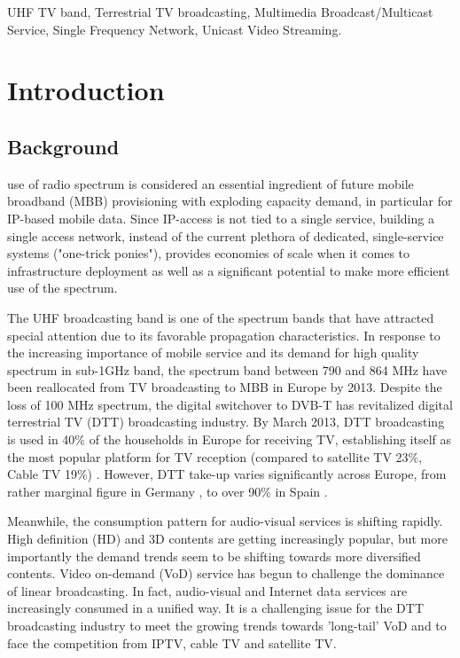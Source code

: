 \documentclass[journal]{IEEEtran}
\begin{document}
\begin{IEEEkeywords}
UHF TV band, Terrestrial TV broadcasting,  Multimedia Broadcast/Multicast Service, Single Frequency Network, Unicast Video Streaming.
\end{IEEEkeywords}
\IEEEpeerreviewmaketitle

\section{Introduction}
\label{sec:intro}
\subsection{Background}
 use of radio spectrum is considered an essential ingredient of future mobile broadband (MBB) provisioning with exploding capacity demand, in particular for IP-based mobile data. Since IP-access is not tied to a single service, building a single access network, instead of the current plethora of dedicated, single-service systems ("one-trick ponies"), provides economies of scale when it comes to infrastructure deployment as well as a significant potential to make more efficient use of the spectrum.

The UHF broadcasting band is one of the spectrum bands that have attracted special attention due to its favorable  propagation characteristics. In response to the increasing importance of mobile service and its demand for high quality spectrum in sub-1GHz band, the spectrum band between 790 and 864 MHz have been reallocated from TV broadcasting to MBB in Europe by 2013. Despite the loss of 100 MHz spectrum, the digital switchover to DVB-T has revitalized digital terrestrial TV (DTT) broadcasting industry. By March 2013, DTT broadcasting is used in 40\%  of the households in Europe for receiving TV, establishing itself as the most popular platform for TV reception (compared to satellite TV 23\%, Cable TV 19\%) \cite{TNS}. However, DTT take-up varies significantly across Europe, from rather marginal figure in Germany \cite{Reimers}, to over 90\% in Spain \cite{March}.

Meanwhile, the consumption pattern for audio-visual services is shifting rapidly. High definition (HD) and 3D contents are getting increasingly popular, but more importantly the demand trends seem to be shifting towards more diversified contents. Video on-demand (VoD) service has begun to challenge the dominance of linear broadcasting. In fact, audio-visual and Internet data services are increasingly consumed in a unified way. It is a challenging issue for the DTT broadcasting industry to meet the growing trends towards 'long-tail' VoD and to face the competition from IPTV, cable TV and satellite TV.
\end{document}
